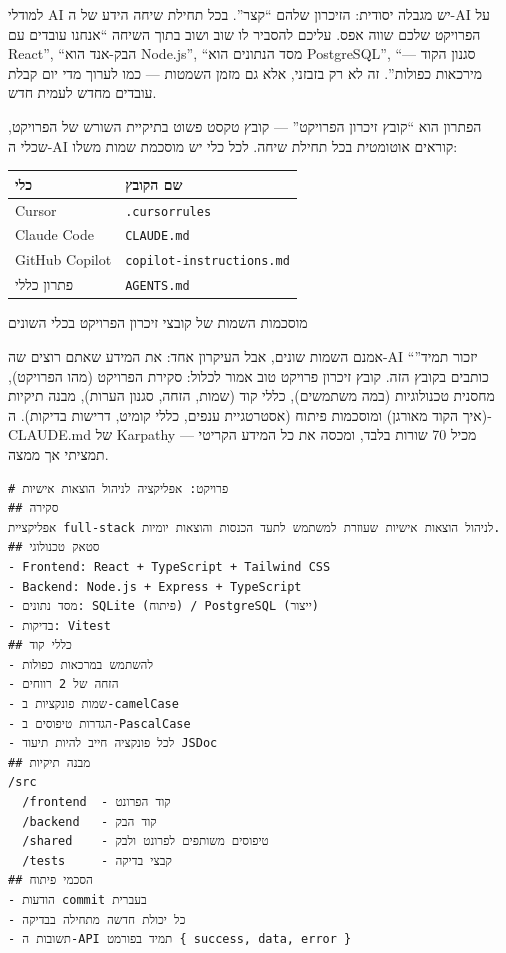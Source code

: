 


למודלי AI יש מגבלה יסודית: הזיכרון שלהם “קצר”. בכל תחילת שיחה הידע של ה-AI על הפרויקט שלכם שווה אפס. עליכם להסביר לו שוב ושוב בתוך השיחה “אנחנו עובדים עם React”, “הבק-אנד הוא Node.js”, “מסד הנתונים הוא PostgreSQL”, “סגנון הקוד — מירכאות כפולות”. זה לא רק בזבזני, אלא גם מזמן השמטות — כמו לערוך מדי יום קבלת עובדים מחדש לעמית חדש.

הפתרון הוא “קובץ זיכרון הפרויקט” — קובץ טקסט פשוט בתיקיית השורש של הפרויקט, שכלי ה-AI קוראים אוטומטית בכל תחילת שיחה. לכל כלי יש מוסכמת שמות משלו:

\begin{center}
\begin{tabularx}{\linewidth}{|X|X|}
\hline
\textbf{כלי} & \textbf{שם הקובץ} \tabularnewline
\hline
Cursor & \texttt{.\allowbreak cursorrules} \tabularnewline
Claude Code & \texttt{CLAUDE.\allowbreak md} \tabularnewline
GitHub Copilot & \texttt{copilot-\allowbreak instructions.\allowbreak md} \tabularnewline
פתרון כללי & \texttt{AGENTS.\allowbreak md} \tabularnewline
\hline
\end{tabularx}
\end{center}

\begin{center}\small\color{gray}מוסכמות השמות של קובצי זיכרון הפרויקט בכלי השונים\end{center}

אמנם השמות שונים, אבל העיקרון אחד: את המידע שאתם רוצים שה-AI “יזכור תמיד” כותבים בקובץ הזה. קובץ זיכרון פרויקט טוב אמור לכלול: סקירת הפרויקט (מהו הפרויקט), מחסנית טכנולוגיות (במה משתמשים), כללי קוד (שמות, הזחה, סגנון הערות), מבנה תיקיות (איך הקוד מאורגן) ומוסכמות פיתוח (אסטרטגיית ענפים, כללי קומיט, דרישות בדיקות). ה-CLAUDE.md של Karpathy מכיל 70 שורות בלבד, ומכסה את כל המידע הקריטי — תמציתי אך ממצה.

\begin{lstlisting}
# פרויקט: אפליקציה לניהול הוצאות אישיות
## סקירה
אפליקציית full-stack לניהול הוצאות אישיות שעוזרת למשתמש לתעד הכנסות והוצאות יומיות.
## סטאק טכנולוגי
- Frontend: React + TypeScript + Tailwind CSS
- Backend: Node.js + Express + TypeScript
- מסד נתונים: SQLite (פיתוח) / PostgreSQL (ייצור)
- בדיקות: Vitest
## כללי קוד
- להשתמש במרכאות כפולות
- הזחה של 2 רווחים
- שמות פונקציות ב-camelCase
- הגדרות טיפוסים ב-PascalCase
- לכל פונקציה חייב להיות תיעוד JSDoc
## מבנה תיקיות
/src
  /frontend  - קוד הפרונט
  /backend   - קוד הבק
  /shared    - טיפוסים משותפים לפרונט ולבק
  /tests     - קבצי בדיקה
## הסכמי פיתוח
- הודעות commit בעברית
- כל יכולת חדשה מתחילה בבדיקה
- תשובות ה-API תמיד בפורמט { success, data, error }
\end{lstlisting}

